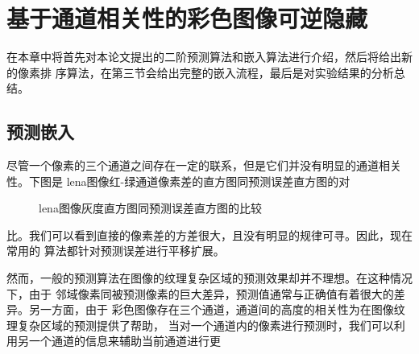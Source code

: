 ﻿\chapter{基于通道相关性的彩色图像可逆隐藏}
\label{c:proposed}
在本章中将首先对本论文提出的二阶预测算法和嵌入算法进行介绍，然后将给出新的像素排
序算法，在第三节会给出完整的嵌入流程，最后是对实验结果的分析总结。


\section{预测嵌入}
尽管一个像素的三个通道之间存在一定的联系，但是它们并没有明显的通道相关性。下图是
lena图像红-绿通道像素差的直方图同预测误差直方图的对
\begin{figure}[!h]
\centering 
{}
\caption{lena图像灰度直方图同预测误差直方图的比较}
\label{fig:lena_rg_pe_compare}
\end{figure}
比。我们可以看到直接的像素差的方差很大，且没有明显的规律可寻。因此，现在常用的
算法都针对预测误差进行平移扩展。
\par
然而，一般的预测算法在图像的纹理复杂区域的预测效果却并不理想。在这种情况下，由于
邻域像素同被预测像素的巨大差异，预测值通常与正确值有着很大的差异。另一方面，由于
彩色图像存在三个通道，通道间的高度的相关性为在图像纹理复杂区域的预测提供了帮助，
当对一个通道内的像素进行预测时，我们可以利用另一个通道的信息来辅助当前通道进行更
